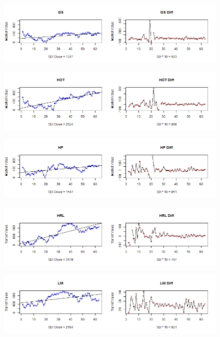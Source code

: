 \begin{figure}[!h]
	\includegraphics[scale=0.5]{images/appendixC/GS_FRST.png}
\end{figure}

\begin{figure}[!h]
	\includegraphics[scale=0.5]{images/appendixC/HOT_FRST.png}
\end{figure}

\begin{figure}[!h]
	\includegraphics[scale=0.5]{images/appendixC/HP_FRST.png}
\end{figure}

\begin{figure}[!h]
	\includegraphics[scale=0.5]{images/appendixC/HRL_FRST.png}
\end{figure}

\begin{figure}[!h]
	\includegraphics[scale=0.5]{images/appendixC/LM_FRST.png}
\end{figure}

